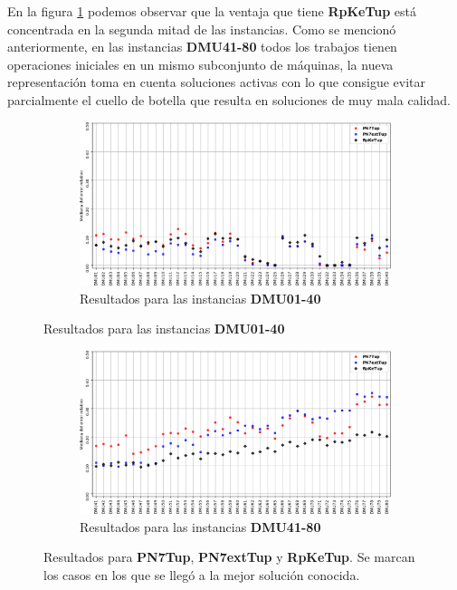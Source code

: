 En la figura \ref{fig:n7vsn8vsprerr} podemos observar que la ventaja que tiene \textbf{RpKeTup} está concentrada en la segunda mitad de las instancias. Como se mencionó anteriormente, en las instancias \textbf{DMU41-80} todos los trabajos tienen operaciones iniciales en un mismo subconjunto de máquinas, la nueva representación toma en cuenta soluciones activas con lo que consigue evitar parcialmente el cuello de botella que resulta en soluciones de muy mala calidad.
\begin{figure}[hbtp]
    \begin{subfigure}{\textwidth}
        \centering
        \includegraphics[scale=.6]{Imagenes/prvsn7vsn8err1.png}
        \caption{Resultados para las instancias \textbf{DMU01-40}}
    \end{subfigure}
\end{figure}
\begin{figure}[H]\ContinuedFloat
    \begin{subfigure}{\textwidth}
        \centering
        \includegraphics[scale=.6]{Imagenes/prvsn7vsn8err2.png}
        \caption{Resultados para las instancias \textbf{DMU41-80}}
    \end{subfigure}
    \caption{Resultados para \textbf{PN7Tup}, \textbf{PN7extTup} y \textbf{RpKeTup}. Se marcan los casos en los que se llegó a la mejor solución conocida.}
    \label{fig:n7vsn8vsprerr}
\end{figure}

